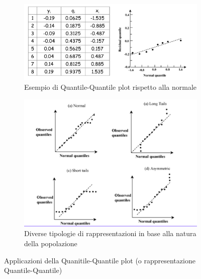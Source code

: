 \begin{figure}[h]

\centering
\begin{subfigure}[b]{0.5\textwidth}
\centering
\includegraphics[width=\textwidth]{img/chapter-4/qqplot-ex.png}
\caption{Esempio di Quantile-Quantile plot rispetto alla normale}\label{img:qqplot-ex}
\end{subfigure}

\hfill

\begin{subfigure}[b]{0.6\textwidth}
\centering
\includegraphics[width=\textwidth]{img/chapter-4/qqplot-confronto.png}
\caption{Diverse tipologie di rappresentazioni in base alla natura della popolazione}\label{img:qqplot-confronto}
\end{subfigure}

\caption{Applicazioni della Quanitile-Quantile plot (o  rappresentazione Quantile-Quantile)}\label{img:qqplot}
\end{figure}

